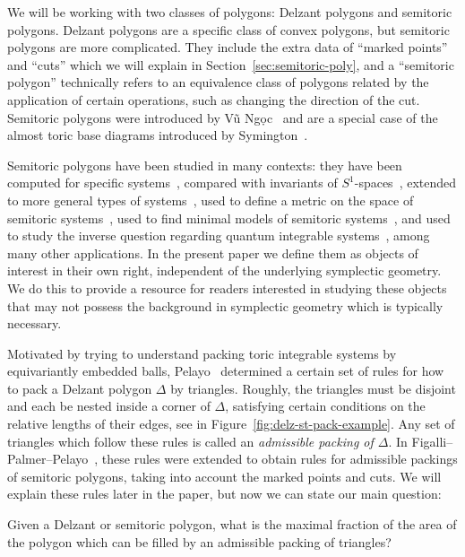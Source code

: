 \documentclass[10pt,a4paper]{amsart}
\numberwithin{equation}{section}
\theoremstyle{definition}
\theoremstyle{plain}
\theoremstyle{plain}
\begin{document}
We will be working with two classes of polygons: Delzant polygons and semitoric polygons. Delzant polygons are a specific class of convex polygons, but semitoric polygons are more complicated. They include the extra data of ``marked points'' and ``cuts'' which we will explain in Section~\ref{sec:semitoric-poly},
and a ``semitoric polygon'' technically refers to an equivalence class of polygons related by the application of certain operations, such as changing the direction of the cut.
Semitoric polygons were introduced by V\~{u} Ng\d{o}c~\cite{VN2007} and are a special case of the almost toric base diagrams introduced by Symington~\cite{Sy2003}.

Semitoric polygons have been studied in many contexts: they have been computed for specific systems~\cite{ADH-momenta,HohMeu,HoPa2017,LFPal, LFP}, compared with invariants of $S^1$-spaces~\cite{HP-extend, HSS2015}, extended to more general types of systems~\cite{PPT-nonsimple, PeRaVN2015},
used to define a metric on the space of semitoric systems~\cite{PaSTMetric2015},
used to find minimal models of semitoric systems~\cite{KPP2015,KPP2018}, and used to study the inverse question regarding quantum integrable systems~\cite{LFPeVN2016,LFVN2021}, among many other applications.
In the present paper we define them as objects of interest in their own right, independent of the underlying symplectic geometry. We do this to provide a resource for readers interested in studying these objects that may not possess the background in symplectic geometry which is typically necessary.

Motivated by trying to understand packing toric integrable systems by equivariantly embedded balls, Pelayo~\cite{Pe2006, Pe2007} determined a certain set of rules for how to pack a Delzant polygon $\Delta$ by triangles.
Roughly, the triangles must be disjoint and each be nested inside a corner of $\Delta$, satisfying certain conditions on the relative lengths of their edges, see in Figure~\ref{fig:delz-st-pack-example}.
Any set of triangles which follow
these rules is called
an \emph{admissible packing of $\Delta$}.
In Figalli--Palmer--Pelayo~\cite{FiPaPe2016}, these rules were extended to obtain rules for admissible packings of semitoric polygons, taking into account the marked points and cuts.
We will explain these rules later in the paper, but now we can state our main question:

\begin{Question}
 Given a Delzant or semitoric polygon, what is the maximal fraction of the area of the polygon which can be filled by an admissible packing of triangles?
\end{Question}
\end{document}
